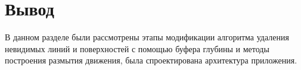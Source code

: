 \section{Вывод}


В данном разделе были рассмотрены этапы модификации алгоритма удаления невидимых линий и поверхностей с помощью буфера глубины и методы построения размытия движения, была спроектирована архитектура приложения. 


